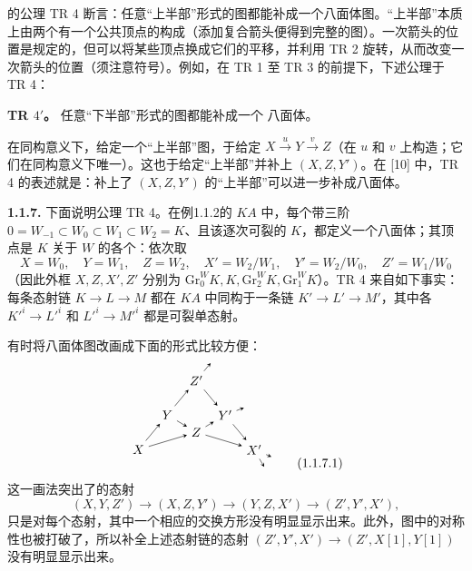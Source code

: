 的公理 TR 4 断言：任意“上半部”形式的图都能补成一个八面体图。“上半部”本质上由两个有一个公共顶点的构成（添加复合箭头便得到完整的图）。一次箭头的位置是规定的，但可以将某些顶点换成它们的平移，并利用 TR 2 旋转，从而改变一次箭头的位置（须注意符号）。例如，在 TR 1 至 TR 3 的前提下，下述公理于 TR 4：

\noindent\textbf{TR $4'$。} 任意“下半部”形式的图都能补成一个
八面体。

在同构意义下，给定一个“上半部”图，于给定 $X\xrightarrow{u}Y\xrightarrow{v}Z$（在 $u$ 和 $v$ 上构造；它们在同构意义下唯一）。这也于给定“上半部”并补上 $(X,Z,Y')$。在 [10] 中，TR 4 的表述就是：补上了 $(X,Z,Y')$ 的“上半部”可以进一步补成八面体。

\par\medskip\noindent\textbf{1.1.7.} 下面说明公理 TR 4。在例1.1.2的 $KA$ 中，每个带三阶 $0=W_{-1}\subset W_0\subset W_1\subset W_2=K$、且该逐次可裂的 $K$，都定义一个八面体；其顶点是 $K$ 关于 $W$ 的各个：依次取
\[
 X=W_0,\quad Y=W_1,\quad Z=W_2,\quad X'=W_2/W_1,\quad
 Y'=W_2/W_0,\quad Z'=W_1/W_0
\]
（因此外框 $X,Z,X',Z'$ 分别为 $\mathrm{Gr}^W_0K,K,\mathrm{Gr}^W_2K,\mathrm{Gr}^W_1K$）。TR 4 来自如下事实：每条态射链 $K\to L\to M$ 都在 $KA$ 中同构于一条链 $K'\to L'\to M'$，其中各 $K'^i\to L'^i$ 和 $L'^i\to M'^i$ 都是可裂单态射。

有时将八面体图改画成下面的形式比较方便：
\begin{equation*}
\begin{tikzpicture}[>=stealth,scale=.8]
\node(a)at(0,0){$X$};\node(b)at(1,1.2){$Y$};\node(c)at(2,2.4){$Z'$};\node(d)at(2,.6){$Z$};\node(e)at(3,1.2){$Y'$};\node(f)at(4,0){$X'$};
\draw[->](a)--(b);\draw[->](b)--(c);\draw[->](c)--(e);\draw[->](e)--(f);\draw[->](a)--(d);\draw[->](b)--(d);\draw[->](d)--(e);\draw[->](d)--(f);
\draw[->](c)--++(.5,.6);\draw[->](e)--++(.65,.25);\draw[->](f)--++(.6,-.25);\draw[->](f)--++(.35,-.6);
\end{tikzpicture}
\tag{1.1.7.1}
\end{equation*}
这一画法突出了的态射
\[
 (X,Y,Z')\longrightarrow(X,Z,Y')\longrightarrow(Y,Z,X')\longrightarrow(Z',Y',X'),
\]
只是对每个态射，其中一个相应的交换方形没有明显显示出来。此外，图中的对称性也被打破了，所以补全上述态射链的态射 $(Z',Y',X')\to(Z',X[1],Y[1])$ 没有明显显示出来。

